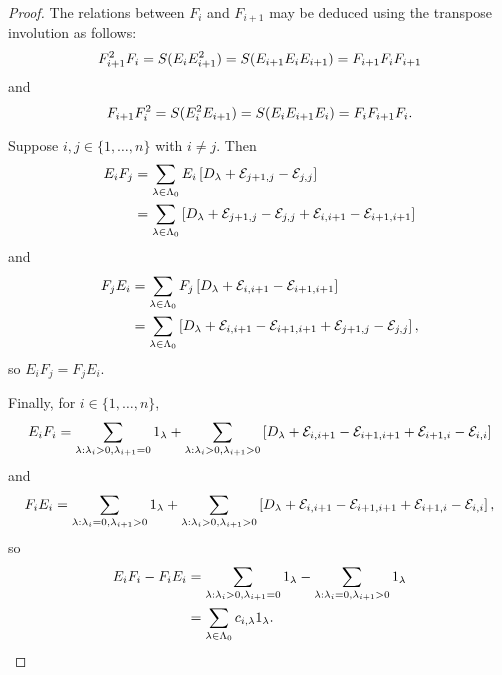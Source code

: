 \documentclass[a4paper, 11pt]{report}
\begin{document}
\begin{proof}
The relations between $F_i$ and $F_{i+1}$ may be deduced using the transpose involution as follows:
\begin{equation*}
F_{i+1}^2F_i = S{(E_iE_{i+1}^2)} = S{(E_{i+1}E_iE_{i+1})} = F_{i+1}F_iF_{i+1}
\end{equation*}
and
\begin{equation*}
F_{i+1}F_i^2 = S{(E_i^2E_{i+1})} = S{(E_iE_{i+1}E_i)} = F_iF_{i+1}F_i.
\end{equation*}

Suppose $i,j\in\{1,\ldots,n\}$ with $i\neq j$. Then
\begin{align*}
E_iF_j &= \sum_{\lambda\in\Lambda_0{}} E_i\left[D_{\lambda}+\mathcal{E}_{j+1,j}-\mathcal{E}_{j,j}\right]\\
&= \sum_{\lambda\in\Lambda_0{}} \left[D_{\lambda}+\mathcal{E}_{j+1,j}-\mathcal{E}_{j,j}+\mathcal{E}_{i,i+1}-\mathcal{E}_{i+1,i+1}\right]
\end{align*}
and
\begin{align*}
F_jE_i &= \sum_{\lambda\in\Lambda_0{}} F_j\left[D_{\lambda}+\mathcal{E}_{i,i+1}-\mathcal{E}_{i+1,i+1}\right]\\
&= \sum_{\lambda\in\Lambda_0{}} \left[D_{\lambda}+\mathcal{E}_{i,i+1}-\mathcal{E}_{i+1,i+1}+\mathcal{E}_{j+1,j}-\mathcal{E}_{j,j}\right],
\end{align*}
so $E_iF_j=F_jE_i$.

Finally, for $i\in\{1,\ldots,n\}$,
\begin{equation*}
E_iF_i = \sum_{\lambda:\lambda_i>0,\lambda_{i+1}=0}1_\lambda +\sum_{\lambda:\lambda_i>0,\lambda_{i+1}>0}\left[D_{\lambda}+\mathcal{E}_{i,i+1}-\mathcal{E}_{i+1,i+1}+\mathcal{E}_{i+1,i}-\mathcal{E}_{i,i}\right]
\end{equation*}
and
\begin{equation*}
F_iE_i = \sum_{\lambda:\lambda_i=0,\lambda_{i+1}>0}1_\lambda +\sum_{\lambda:\lambda_i>0,\lambda_{i+1}>0}\left[D_{\lambda}+\mathcal{E}_{i,i+1}-\mathcal{E}_{i+1,i+1}+\mathcal{E}_{i+1,i}-\mathcal{E}_{i,i}\right],
\end{equation*}
so
\begin{align*}
E_iF_i-F_iE_i &= \sum_{\lambda:\lambda_i>0,\lambda_{i+1}=0}1_\lambda -\sum_{\lambda:\lambda_i=0,\lambda_{i+1}>0}1_\lambda\\
&= \sum_{\lambda\in\Lambda_0{}} c_{i,\lambda}1_\lambda.
\end{align*}
\end{proof}
\end{document}
